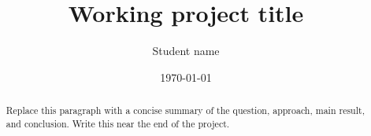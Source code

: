 \documentclass[12pt]{report}
\title{Working project title}
\author{Student name}
\date{\today}
\begin{document}
\maketitle

\begin{abstract}
Replace this paragraph with a concise summary of the question, approach, main result, and conclusion. Write this near the end of the project.
\end{abstract}

\tableofcontents










\end{document}

